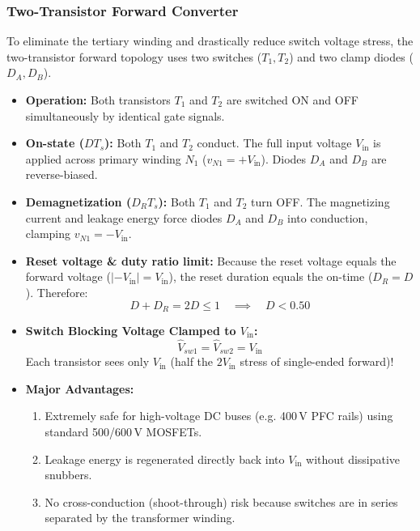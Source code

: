 \subsubsection{Two-Transistor Forward Converter}
To eliminate the tertiary winding and drastically reduce switch voltage stress, the two-transistor forward topology uses two switches ($T_1, T_2$) and two clamp diodes ($D_A, D_B$).
\begin{itemize}
  \item \textbf{Operation:} Both transistors $T_1$ and $T_2$ are switched ON and OFF simultaneously by identical gate signals.
  \item \textbf{On-state ($D T_s$):} Both $T_1$ and $T_2$ conduct. The full input voltage $V_{\mathrm{in}}$ is applied across primary winding $N_1$ ($v_{N1} = +V_{\mathrm{in}}$). Diodes $D_A$ and $D_B$ are reverse-biased.
  \item \textbf{Demagnetization ($D_R T_s$):} Both $T_1$ and $T_2$ turn OFF. The magnetizing current and leakage energy force diodes $D_A$ and $D_B$ into conduction, clamping $v_{N1} = -V_{\mathrm{in}}$.
  \item \textbf{Reset voltage \& duty ratio limit:} Because the reset voltage equals the forward voltage ($|-V_{\mathrm{in}}| = V_{\mathrm{in}}$), the reset duration equals the on-time ($D_R = D$). Therefore:
  \begin{equation}
  D + D_R = 2D \le 1 \quad\implies\quad D < 0.50
  \end{equation}
  \item \textbf{Switch Blocking Voltage Clamped to $V_{\mathrm{in}}$:}
  \begin{equation}
  \hat{V}_{sw1} = \hat{V}_{sw2} = V_{\mathrm{in}}
  \end{equation}
  Each transistor sees only $V_{\mathrm{in}}$ (half the $2 V_{\mathrm{in}}$ stress of single-ended forward)!
  \item \textbf{Major Advantages:}
  \begin{enumerate}
    \item Extremely safe for high-voltage DC buses (e.g. 400\,V PFC rails) using standard 500/600\,V MOSFETs.
    \item Leakage energy is regenerated directly back into $V_{\mathrm{in}}$ without dissipative snubbers.
    \item No cross-conduction (shoot-through) risk because switches are in series separated by the transformer winding.
  \end{enumerate}
\end{itemize}


